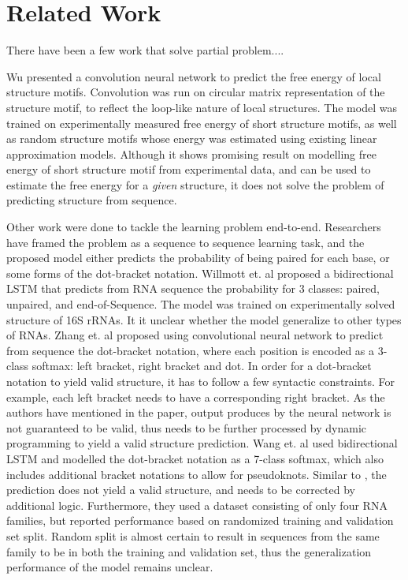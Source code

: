 \documentclass{article}
\begin{document}

\section{Related Work}

There have been a few work that solve partial problem....

Wu\cite{wu2018convolutional} presented a convolution neural network to predict the free energy of local structure motifs.
Convolution was run on circular matrix representation of the structure motif, to reflect the loop-like nature of local structures.
The model was trained on experimentally measured free energy of short structure motifs,
as well as random structure motifs whose energy was estimated using existing linear approximation models.
Although it shows promising result on modelling free energy of short structure motif from experimental data,
and can be used to estimate the free energy for a \textit{given} structure,
it does not solve the problem of predicting structure from sequence.

Other work were done to tackle the learning problem end-to-end.
Researchers have framed the problem as a sequence to sequence learning task,
and the proposed model either predicts the probability of being paired for each base,
or some forms of the dot-bracket notation.
Willmott et. al\cite{willmottstate} proposed a bidirectional LSTM that predicts
from RNA sequence the probability for 3 classes: paired, unpaired, and end-of-Sequence.
The model was trained on experimentally solved structure of 16S rRNAs.
It it unclear whether the model generalize to other types of RNAs.
Zhang et. al\cite{zhang2019new} proposed using convolutional neural network to predict from sequence
the dot-bracket notation, where each position is encoded as a 3-class softmax: left bracket, right bracket and dot.
In order for a dot-bracket notation to yield valid structure, it has to follow a few syntactic constraints.
For example, each left bracket needs to have a corresponding right bracket.
As the authors have mentioned in the paper, output produces by the neural network
is not guaranteed to be valid, thus needs to be further processed by dynamic programming
to yield a valid structure prediction.
Wang et. al\cite{wang2019dmfold} used bidirectional LSTM and modelled the dot-bracket notation as a
7-class softmax, which also includes additional bracket notations to allow for pseudoknots.
Similar to \cite{zhang2019new}, the prediction does not yield a valid structure, and needs to be corrected by additional logic.
Furthermore, they used a dataset consisting of only four RNA families,
but reported performance based on randomized training and validation set split.
Random split is almost certain to result in sequences from the same family to be in both the training and validation set,
thus the generalization performance of the model remains unclear.
\end{document}
